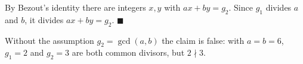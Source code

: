 By Bezout's identity there are integers $x,y$ with $ax+by=g_2$. Since $g_1$ divides $a$ and $b$, it divides $ax+by=g_2$. $\blacksquare$

Without the assumption $g_2=\gcd(a,b)$ the claim is false: with $a=b=6$, $g_1=2$ and $g_2=3$ are both common divisors, but $2\nmid3$.
